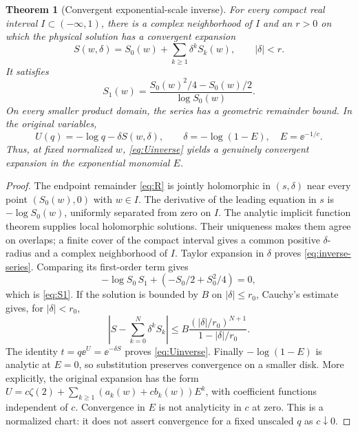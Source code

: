 \documentclass[11pt,a4paper]{article}
\numberwithin{equation}{section}
\newtheorem{theorem}{Theorem}[section]
\theoremstyle{definition}
\theoremstyle{remark}
\begin{document}
\begin{theorem}[Convergent exponential-scale inverse]\label{thm:inverse}
For every compact real interval \(I\subset(-\infty,1)\), there is a
complex neighborhood of \(I\) and an \(r>0\) on which the physical
solution has a convergent expansion
\begin{equation}\label{eq:inverse-series}
 S(w,\delta)=S_0(w)+\sum_{k\ge1}\delta^k S_k(w),\qquad |\delta|<r.
\end{equation}
It satisfies
\begin{equation}\label{eq:S1}
 S_1(w)=\frac{S_0(w)^2/4-S_0(w)/2}{\log S_0(w)}.
\end{equation}
On every smaller product domain, the series has a geometric remainder
bound. In the original variables,
\begin{equation}\label{eq:Uinverse}
 U(q)=-\log q-\delta S(w,\delta),\qquad
 \delta=-\log(1-E),\quad E=\ee^{-1/c}.
\end{equation}
Thus, at fixed normalized \(w\), \eqref{eq:Uinverse} yields a genuinely
convergent expansion in the exponential monomial \(E\).
\end{theorem}
\begin{proof}
The endpoint remainder \eqref{eq:R} is jointly holomorphic in
\((s,\delta)\) near every point \((S_0(w),0)\) with \(w\in I\).
The derivative of the leading equation in \(s\) is
\(-\log S_0(w)\), uniformly separated from zero on \(I\).
The analytic implicit function theorem supplies local holomorphic
solutions. Their uniqueness makes them agree on overlaps; a finite
cover of the compact interval gives a common positive \(\delta\)-radius
and a complex neighborhood of \(I\). Taylor expansion in \(\delta\)
proves \eqref{eq:inverse-series}. Comparing its first-order term gives
\[
 -\log S_0\,S_1+(-S_0/2+S_0^2/4)=0,
\]
which is \eqref{eq:S1}. If the solution is bounded by \(B\) on
\(|\delta|\le r_0\), Cauchy's estimate gives, for \(|\delta|<r_0\),
\[
 \left|S-\sum_{k=0}^N\delta^kS_k\right|
 \le B\frac{(|\delta|/r_0)^{N+1}}{1-|\delta|/r_0}.
\]
The identity \(t=q\ee^U=\ee^{-\delta S}\) proves \eqref{eq:Uinverse}.
Finally \(-\log(1-E)\) is analytic at \(E=0\), so substitution preserves
convergence on a smaller disk. More explicitly, the original expansion has
the form \(U=c\zeta(2)+\sum_{k\ge1}(a_k(w)+cb_k(w))E^k\),
with coefficient functions independent of \(c\). Convergence in \(E\)
is not analyticity in \(c\) at zero. This is a normalized chart: it does not
assert convergence for a fixed unscaled \(q\) as \(c\downarrow0\).
\end{proof}
\end{document}
